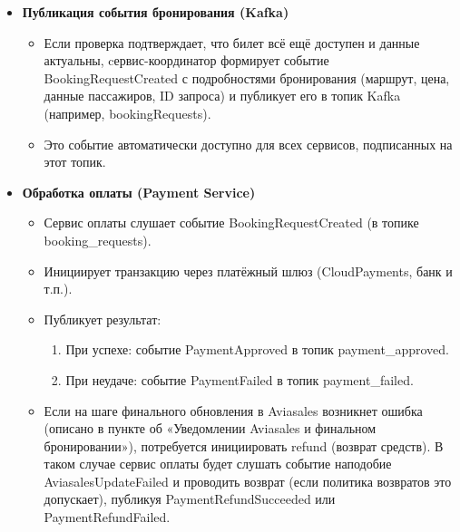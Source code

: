 \begin{enumerate}
\begin{itemize}
        \item \textbf{Публикация события бронирования (Kafka)}
        \begin{itemize}
            \item Если проверка подтверждает, что билет всё ещё доступен и данные актуальны, cервис-координатор формирует событие BookingRequestCreated с подробностями бронирования (маршрут, цена, данные пассажиров, ID запроса) и публикует его в топик Kafka (например, bookingRequests).
            \item Это событие автоматически доступно для всех сервисов, подписанных на этот топик.
        \end{itemize}

        \item \textbf{Обработка оплаты (Payment Service)}
        \begin{itemize}
            \item Сервис оплаты слушает событие BookingRequestCreated (в топике booking\_requests).
            \item Инициирует транзакцию через платёжный шлюз (CloudPayments, банк и т.п.).
            \item Публикует результат:
            \begin{enumerate}
                \item При успехе: событие PaymentApproved в топик payment\_approved.
                \item При неудаче: событие PaymentFailed в топик payment\_failed.
            \end{enumerate}
            \item Если на шаге финального обновления в Aviasales возникнет ошибка (описано в пункте об «Уведомлении Aviasales и финальном бронировании»), потребуется инициировать refund (возврат средств). В таком случае сервис оплаты будет слушать событие наподобие AviasalesUpdateFailed и проводить возврат (если политика возвратов это допускает), публикуя PaymentRefundSucceeded или PaymentRefundFailed.
        \end{itemize}


\end{itemize}
\end{enumerate}
